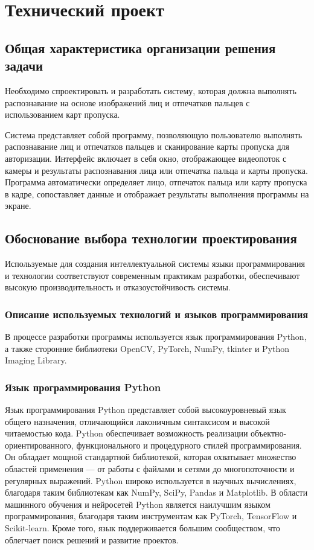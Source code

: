 \section{Технический проект}
\subsection{Общая характеристика организации решения задачи}

Необходимо спроектировать и разработать систему, которая должна выполнять распознавание на основе изображений лиц и отпечатков пальцев с использованием карт пропуска.

Система представляет собой программу, позволяющую пользователю выполнять распознавание лиц и отпечатков пальцев и сканирование карты пропуска для авторизации. Интерфейс включает в себя окно, отображающее видеопоток с камеры и результаты распознавания лица или отпечатка пальца и карты пропуска. Программа автоматически определяет лицо, отпечаток пальца или карту пропуска в кадре, сопоставляет данные и отображает результаты выполнения программы на экране. 

\subsection{Обоснование выбора технологии проектирования}

Используемые для создания интеллектуальной системы языки программирования и технологии соответствуют современным практикам разработки, обеспечивают высокую производительность и отказоустойчивость системы.

\subsubsection{Описание используемых технологий и языков программирования}

В процессе разработки программы используется язык программирования Python, а также сторонние библиотеки OpenCV, PyTorch, NumPy, tkinter и Python Imaging Library.

\subsubsection{Язык программирования Python}

Язык программирования Python представляет собой высокоуровневый язык общего назначения, отличающийся лаконичным синтаксисом и высокой читаемостью кода. Python обеспечивает возможность реализации объектно-ориентированного, функционального и процедурного стилей программирования. Он обладает мощной стандартной библиотекой, которая охватывает множество областей применения — от работы с файлами и сетями до многопоточности и регулярных выражений. Python широко используется в научных вычислениях, благодаря таким библиотекам как NumPy, SciPy, Pandas и Matplotlib. В области машинного обучения и нейросетей Python является наилучшим языком программирования, благодаря таким инструментам как PyTorch, TensorFlow и Scikit-learn. Кроме того, язык поддерживается большим сообществом, что облегчает поиск решений и развитие проектов.

